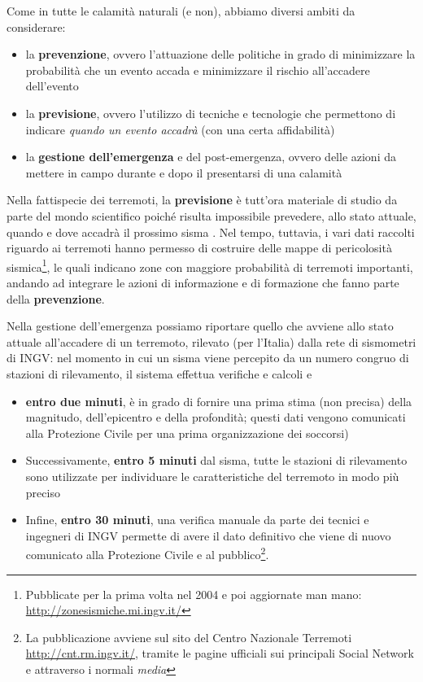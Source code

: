 \documentclass[a4paper,10pt]{memoir}
\begin{document}
Come in tutte le calamità naturali (e non), abbiamo diversi ambiti da considerare:
\begin{itemize}
\item la \textbf{prevenzione}, ovvero l'attuazione delle politiche in grado di minimizzare la probabilità che un evento accada e minimizzare il rischio all'accadere dell'evento
\item la \textbf{previsione}, ovvero l'utilizzo di tecniche e tecnologie che permettono di indicare \textit{quando un evento accadrà} (con una certa affidabilità)
\item la \textbf{gestione dell'emergenza} e del post-emergenza, ovvero delle azioni da mettere in campo durante e dopo il presentarsi di una calamità
\end{itemize}

Nella fattispecie dei terremoti, la \textbf{previsione} è tutt'ora materiale di studio da parte del mondo scientifico poiché risulta impossibile prevedere, allo stato attuale, quando e dove accadrà il prossimo sisma \cite{eqpred} \cite{alessamato}. Nel tempo, tuttavia, i vari dati raccolti riguardo ai terremoti hanno permesso di costruire delle mappe di pericolosità sismica\footnote{Pubblicate per la prima volta nel 2004 e poi aggiornate man mano: \url{http://zonesismiche.mi.ingv.it/}}, le quali indicano zone con maggiore probabilità di terremoti importanti, andando ad integrare le azioni di informazione e di formazione che fanno parte della \textbf{prevenzione}.

Nella gestione dell'emergenza possiamo riportare quello che avviene allo stato attuale all'accadere di un terremoto, rilevato (per l'Italia) dalla rete di sismometri di INGV: nel momento in cui un sisma viene percepito da un numero congruo di stazioni di rilevamento, il sistema effettua verifiche e calcoli e
\begin{itemize}
\item \textbf{entro due minuti}, è in grado di fornire una prima stima (non precisa) della magnitudo, dell'epicentro e della profondità; questi dati vengono comunicati alla Protezione Civile per una prima organizzazione dei soccorsi)
\item Successivamente, \textbf{entro 5 minuti} dal sisma, tutte le stazioni di rilevamento sono utilizzate per individuare le caratteristiche del terremoto in modo più preciso
\item Infine, \textbf{entro 30 minuti}, una verifica manuale da parte dei tecnici e ingegneri di INGV permette di avere il dato definitivo che viene di nuovo comunicato alla Protezione Civile e al pubblico\footnote{La pubblicazione avviene sul sito del Centro Nazionale Terremoti \url{http://cnt.rm.ingv.it/}, tramite le pagine ufficiali sui principali Social Network e attraverso i normali \textit{media}}.
\end{itemize}
\end{document}
